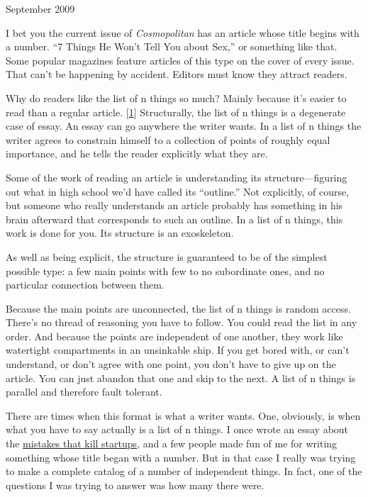 September 2009

I bet you the current issue of \emph{Cosmopolitan} has an article whose
title begins with a number. ``7 Things He Won't Tell You about Sex,'' or
something like that. Some popular magazines feature articles of this
type on the cover of every issue. That can't be happening by accident.
Editors must know they attract readers.

Why do readers like the list of n things so much? Mainly because it's
easier to read than a regular article. {[}\hyperref[f1n]{1}{]}
Structurally, the list of n things is a degenerate case of essay. An
essay can go anywhere the writer wants. In a list of n things the writer
agrees to constrain himself to a collection of points of roughly equal
importance, and he tells the reader explicitly what they are.

Some of the work of reading an article is understanding its
structure---figuring out what in high school we'd have called its
``outline.'' Not explicitly, of course, but someone who really
understands an article probably has something in his brain afterward
that corresponds to such an outline. In a list of n things, this work is
done for you. Its structure is an exoskeleton.

As well as being explicit, the structure is guaranteed to be of the
simplest possible type: a few main points with few to no subordinate
ones, and no particular connection between them.

Because the main points are unconnected, the list of n things is random
access. There's no thread of reasoning you have to follow. You could
read the list in any order. And because the points are independent of
one another, they work like watertight compartments in an unsinkable
ship. If you get bored with, or can't understand, or don't agree with
one point, you don't have to give up on the article. You can just
abandon that one and skip to the next. A list of n things is parallel
and therefore fault tolerant.

There are times when this format is what a writer wants. One, obviously,
is when what you have to say actually is a list of n things. I once
wrote an essay about the \href{startupmistakes.html}{mistakes that kill
startups}, and a few people made fun of me for writing something whose
title began with a number. But in that case I really was trying to make
a complete catalog of a number of independent things. In fact, one of
the questions I was trying to answer was how many there were.

